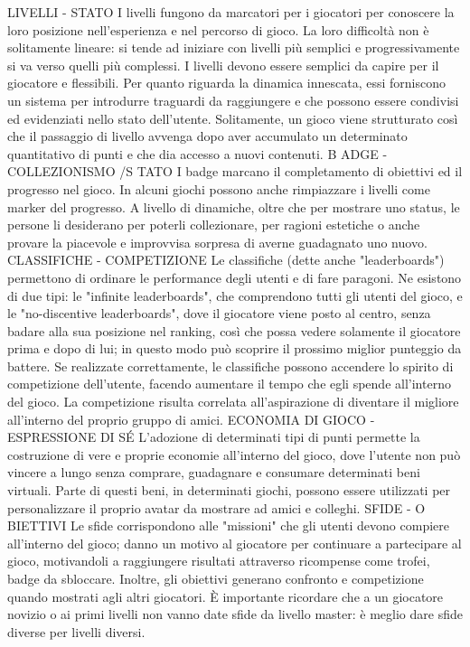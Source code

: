 LIVELLI - STATO I livelli fungono da marcatori per i giocatori per conoscere la
loro posizione nell'esperienza e nel percorso di gioco. La loro difficoltà non è solitamente lineare: si tende ad iniziare con livelli più semplici e progressivamente si va verso quelli più complessi. I livelli devono essere semplici da capire per il giocatore e flessibili.
Per quanto riguarda la dinamica innescata, essi forniscono un sistema per introdurre traguardi da raggiungere e che possono essere condivisi ed evidenziati nello stato dell'utente. Solitamente, un gioco viene strutturato così che il passaggio di livello avvenga dopo aver accumulato un determinato quantitativo di punti e che dia accesso a nuovi contenuti.
B ADGE - COLLEZIONISMO /S TATO I badge marcano il completamento di obiettivi ed il progresso nel gioco. In alcuni giochi possono anche rimpiazzare i livelli come marker del progresso. A livello di dinamiche, oltre che per mostrare uno status, le persone li desiderano per poterli collezionare, per ragioni estetiche o anche provare la piacevole e improvvisa sorpresa di averne guadagnato uno nuovo.
CLASSIFICHE - COMPETIZIONE Le classifiche (dette anche "leaderboards") permettono di ordinare le performance degli utenti e di fare paragoni. Ne esistono di due tipi: le "infinite leaderboards", che comprendono tutti gli utenti del gioco, e le "no-discentive leaderboards", dove il giocatore viene posto al centro, senza badare alla sua posizione nel ranking, così che possa vedere solamente il giocatore prima e dopo di lui; in questo modo
può scoprire il prossimo miglior punteggio da battere.
Se realizzate correttamente, le classifiche possono accendere lo spirito di competizione dell'utente, facendo aumentare il tempo che egli spende all'interno del gioco. La competizione risulta correlata all'aspirazione di diventare il migliore all'interno del proprio gruppo di amici.
ECONOMIA DI GIOCO - ESPRESSIONE DI SÉ L'adozione di determinati tipi di punti permette la costruzione di vere e proprie economie all'interno del gioco, dove l'utente non può vincere a lungo senza comprare, guadagnare e consumare determinati beni virtuali. Parte di questi beni, in determinati giochi, possono essere utilizzati per personalizzare il proprio avatar da mostrare ad amici e colleghi.
SFIDE - O BIETTIVI Le sfide corrispondono alle "missioni" che gli utenti devono compiere all'interno del gioco; danno un motivo al giocatore per continuare a partecipare al gioco, motivandoli a raggiungere risultati attraverso ricompense come trofei, badge da sbloccare. Inoltre, gli obiettivi generano confronto e competizione quando mostrati agli altri giocatori. È importante ricordare che a un giocatore novizio o ai primi livelli non vanno date sfide da livello master: è meglio dare sfide diverse per livelli diversi.
